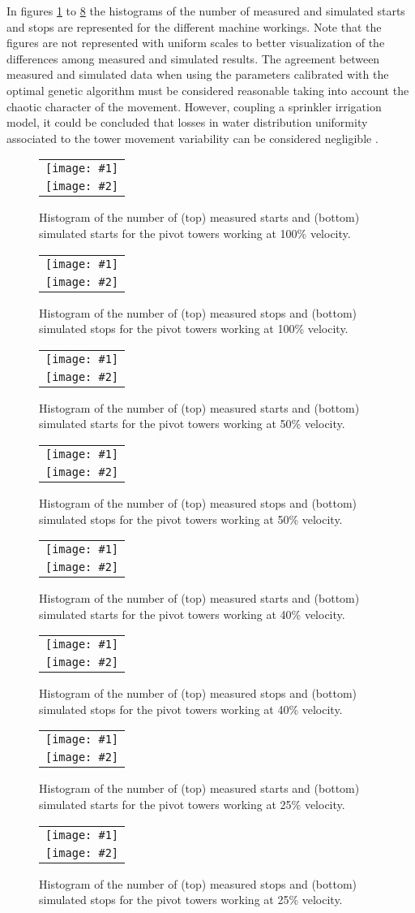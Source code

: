 \documentclass[review,authoryear]{elsarticle}
\newcommand{\FIGII}[4]
{
	\begin{figure}[ht!]
		\centering
		\begin{tabular}{c}
			\texttt{[image: \#1]} \\ \texttt{[image: \#2]}
		\end{tabular}
		\caption{#3.\label{#4}}
	\end{figure}
}
\begin{document}
In figures \ref{FigPivotStart100} to \ref{FigPivotStop25} the histograms of the number
of measured and simulated starts and stops are represented for the different
machine workings.
Note that the figures are not represented with uniform scales to better
visualization of the differences among measured and simulated results.
The agreement between measured and simulated data when using the parameters calibrated with the optimal genetic algorithm must be considered reasonable taking into account the chaotic character of the movement.
However, coupling a sprinkler irrigation model, it could be concluded that losses in water distribution uniformity associated to the tower movement variability can be considered negligible \citep{Ouazaa15}.

\FIGII{pivot-measured-starts-100.eps}{pivot-simulated-starts-100.eps}
{Histogram of the number of (top) measured starts and (bottom)
simulated starts for the pivot towers working at 100\% velocity}
{FigPivotStart100}

\FIGII{pivot-measured-stops-100.eps}{pivot-simulated-stops-100.eps}
{Histogram of the number of (top) measured stops and (bottom)
simulated stops for the pivot towers working at 100\% velocity}
{FigPivotStop100}

\FIGII{pivot-measured-starts-50.eps}{pivot-simulated-starts-50.eps}
{Histogram of the number of (top) measured starts and (bottom)
simulated starts for the pivot towers working at 50\% velocity}
{FigPivotStart50}

\FIGII{pivot-measured-stops-50.eps}{pivot-simulated-stops-50.eps}
{Histogram of the number of (top) measured stops and (bottom)
simulated stops for the pivot towers working at 50\% velocity}
{FigPivotStop50}

\FIGII{pivot-measured-starts-40.eps}{pivot-simulated-starts-40.eps}
{Histogram of the number of (top) measured starts and (bottom)
simulated starts for the pivot towers working at 40\% velocity}
{FigPivotStart40}

\FIGII{pivot-measured-stops-40.eps}{pivot-simulated-stops-40.eps}
{Histogram of the number of (top) measured stops and (bottom)
simulated stops for the pivot towers working at 40\% velocity}
{FigPivotStop40}

\FIGII{pivot-measured-starts-25.eps}{pivot-simulated-starts-25.eps}
{Histogram of the number of (top) measured starts and (bottom)
simulated starts for the pivot towers working at 25\% velocity}
{FigPivotStart25}

\FIGII{pivot-measured-stops-25.eps}{pivot-simulated-stops-25.eps}
{Histogram of the number of (top) measured stops and (bottom)
simulated stops for the pivot towers working at 25\% velocity}
{FigPivotStop25}
\end{document}
